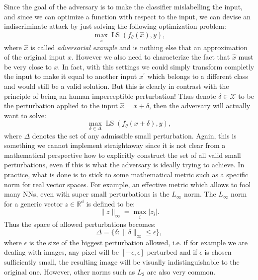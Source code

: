 \documentclass[LaM,binding=0.6cm]{./packages/sapthesis/sapthesis}
\begin{document}
        Since the goal of the adversary is to make the classifier mislabelling the input, and since we can optimize a function with respect to the input, we can devise an indiscriminate attack by just
        solving the following optimization problem:
        \begin{equation}
            \displaystyle{\max_{\hat{x}} \operatorname{LS}\left(f_{\theta}\left( \hat{x} \right), y\right)},
        \end{equation}
        where $\hat{x}$ is called \textit{adversarial example} and is nothing else that an approximation of the original input $x$. However we also need to characterize the fact that $\hat{x}$ must be very
        close to $x$. In fact, with this settings we could simply transform completly the input to make it equal to another input $x^{\prime}$ which belongs to a different class and would still be
        a valid solution. But this is clearly in contrast with the principle of being an human imperceptible perturbation! Thus denote $\delta \in \mathcal{X}$ to be the perturbation applied
        to the input $\hat{x} = x + \delta $, then the adversary will actually want to solve:
        \begin{equation}
            \label{attackobj}
            \displaystyle{\max_{\delta \in \Delta} \operatorname{LS}\left(f_{\theta}\left( x + \delta \right), y\right)},
        \end{equation} 
        where $\Delta$ denotes the set of any admissible small perturbation. Again, this is something we cannot implement straightaway since it is not clear from a mathematical perspective how to
        explicitly construct the set of all valid small perturbations, even if this is what the adversary is ideally trying to achieve. In practice, what is done is to stick to some mathematical metric such as 
        a specific norm for real vector spaces. For example, an effective metric which allows to fool many NNs, even with super small perturbations is the $L_{\infty}$ norm. The $L_{\infty}$ norm
        for a generic vector $z \in \mathbb{R^d}$ is defined to be:
        \begin{equation}
            \label{linfnorm}
            \|z\|_{\infty}=\max _{i}\left|z_{i}\right|.
        \end{equation}    
        Thus the space of allowed perturbations becomes:
        \begin{equation}
            \Delta = \{ \delta: \|\delta\|_{\infty} \leq \epsilon\},
        \end{equation}
        where $\epsilon$ is the size of the biggest perturbation allowed, i.e. if for example we are dealing with images, any pixel will be $[- \epsilon, \epsilon] $ perturbed and if $\epsilon$
        is chosen sufficiently small, the resulting image will be visually indistinguishable to the original one. However, other norms such as $L_2$ are also very common.
\end{document}
